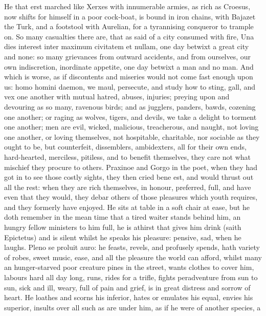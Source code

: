 {{He that erst marched like Xerxes with innumerable armies, as rich as
Croesus, now shifts for himself in a poor cock-boat, is bound in iron
chains, with Bajazet the Turk, and a footstool with Aurelian, for a
tyrannising conqueror to trample on. So many casualties there are, that
as \Seneca said of a city consumed with fire, Una dies interest inter
maximum civitatem et nullam, one day betwixt a great city and none: so
many grievances from outward accidents, and from ourselves, our own
indiscretion, inordinate appetite, one day betwixt a man and no man.
And which is worse, as if discontents and miseries would not come fast
enough upon us: homo homini daemon, we maul, persecute, and study how
to sting, gall, and vex one another with mutual hatred, abuses,
injuries; preying upon and devouring as so many, ravenous birds;
and as jugglers, panders, bawds, cozening one another; or raging as
wolves, tigers, and devils, we take a delight to torment one
another; men are evil, wicked, malicious, treacherous, and
naught, not loving one another, or loving themselves, not
hospitable, charitable, nor sociable as they ought to be, but
counterfeit, dissemblers, ambidexters, all for their own ends,
hard-hearted, merciless, pitiless, and to benefit themselves, they care
not what mischief they procure to others. Praxinoe and Gorgo in
the poet, when they had got in to see those costly sights, they then
cried bene est, and would thrust out all the rest: when they are rich
themselves, in honour, preferred, full, and have even that they would,
they debar others of those pleasures which youth requires, and they
formerly have enjoyed. He sits at table in a soft chair at ease, but he
doth remember in the mean time that a tired waiter stands behind him,
an hungry fellow ministers to him full, he is athirst that gives him
drink (saith Epictetus) and is silent whilst he speaks his
pleasure: pensive, sad, when he laughs. Pleno se proluit auro: he
feasts, revels, and profusely spends, hath variety of robes, sweet
music, ease, and all the pleasure the world can afford, whilst many an
hunger-starved poor creature pines in the street, wants clothes to
cover him, labours hard all day long, runs, rides for a trifle, fights
peradventure from sun to sun, sick and ill, weary, full of pain and
grief, is in great distress and sorrow of heart. He loathes and scorns
his inferior, hates or emulates his equal, envies his superior, insults
over all such as are under him, as if he were of another species, a
}}
